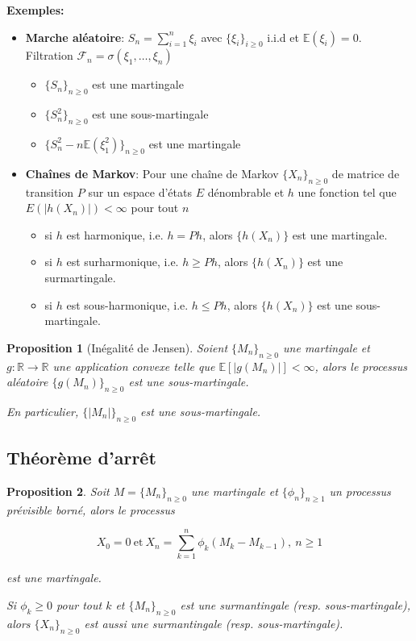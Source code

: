 \documentclass[10pt,a4paper,oneside]{article}
\newtheorem{proposition}{Proposition}
\begin{document}
\textbf{Exemples:}

\begin{itemize}
\item
\textbf{Marche aléatoire}: $S_n = \sum_{i = 1}^n \xi_i$ avec $\{ \xi_i \}_{i \geq 0}$ i.i.d et $\mathbb{E}(\xi_i) = 0$. Filtration $\mathcal{F}_n = \sigma(\xi_1,\ldots,\xi_n)$

\begin{itemize}
\item
$\{ S_n \}_{n \geq 0}$ est une martingale
\item
$\{ S_n^2 \}_{n \geq 0}$ est une sous-martingale
\item
$\{ S_n^2 - n \mathbb{E}(\xi_1^2) \}_{n \geq 0}$ est une martingale
\end{itemize}

\item
\textbf{Chaînes de Markov}: Pour une chaîne de Markov $\{ X_n \}_{n \geq 0}$ de matrice de transition $P$ sur un espace d'états $E$ dénombrable et $h$ une fonction tel que $E(|h(X_n)|) < \infty$ pour tout $n$

\begin{itemize}
\item
si $h$ est harmonique, i.e. $h = Ph$, alors $\{ h(X_n) \}$ est une martingale.
\item
si $h$ est surharmonique, i.e. $h \geq Ph$, alors $\{ h(X_n) \}$ est une surmartingale.
\item
si $h$ est sous-harmonique, i.e. $h \leq Ph$, alors $\{ h(X_n) \}$ est une sous-martingale.
\end{itemize}
\end{itemize}

\begin{proposition}[Inégalité de Jensen]
Soient $\{ M_n \}_{n \geq 0}$ une martingale et $g : \mathbb{R} \to \mathbb{R}$ une application convexe telle que $\mathbb{E}[|g(M_n)|] < \infty$, alors le processus aléatoire $\{ g(M_n) \}_{n \geq 0}$ est une sous-martingale.

En particulier, $\{ |M_n| \}_{n \geq 0}$ est une sous-martingale.
\end{proposition}

\subsection{Théorème d'arrêt}

\begin{proposition}
Soit $M = \{ M_n \}_{n \geq 0}$ une martingale et $\{ \phi_n \}_{n \geq 1}$ un processus prévisible borné, alors le processus

\[ X_0 = 0\ \text{et}\ X_n = \sum_{k = 1}^n \phi_k(M_k - M_{k - 1}),\ n \geq 1 \]

est une martingale.

Si $\phi_k \geq 0$ pour tout $k$ et $\{ M_n \}_{n \geq 0}$ est une surmantingale (resp. sous-martingale), alors $\{ X_n \}_{n \geq 0}$ est aussi une surmantingale (resp. sous-martingale).
\end{proposition}
\end{document}
